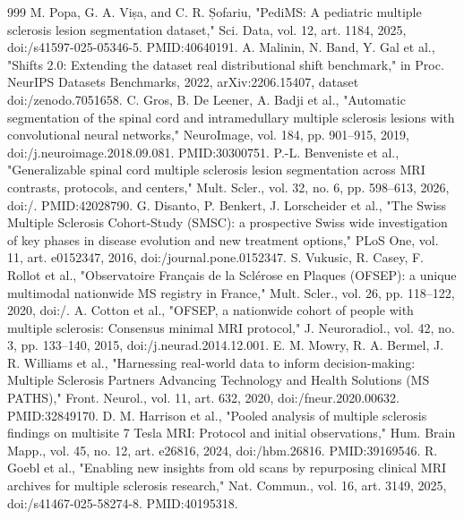 \documentclass[journal,twoside,web]{ieeecolor}
\begin{document}
\begin{thebibliography}{999}
 M. Popa, G. A. Vișa, and C. R. Șofariu, "PediMS: A pediatric multiple sclerosis lesion segmentation dataset," Sci. Data, vol. 12, art. 1184, 2025, doi:/\allowbreak s41597-025-05346-5. PMID:40640191.
 A. Malinin, N. Band, Y. Gal et al., "Shifts 2.0: Extending the dataset real distributional shift benchmark," in Proc. NeurIPS Datasets Benchmarks, 2022, arXiv:2206.15407, dataset doi:/\allowbreak zenodo.7051658.
 C. Gros, B. De Leener, A. Badji et al., "Automatic segmentation of the spinal cord and intramedullary multiple sclerosis lesions with convolutional neural networks," NeuroImage, vol. 184, pp. 901--915, 2019, doi:/\allowbreak j.neuroimage.2018.09.081. PMID:30300751.
 P.-L. Benveniste et al., "Generalizable spinal cord multiple sclerosis lesion segmentation across MRI contrasts, protocols, and centers," Mult. Scler., vol. 32, no. 6, pp. 598--613, 2026, doi:/. PMID:42028790.
 G. Disanto, P. Benkert, J. Lorscheider et al., "The Swiss Multiple Sclerosis Cohort-Study (SMSC): a prospective Swiss wide investigation of key phases in disease evolution and new treatment options," PLoS One, vol. 11, art. e0152347, 2016, doi:/\allowbreak journal.pone.0152347.
 S. Vukusic, R. Casey, F. Rollot et al., "Observatoire Français de la Sclérose en Plaques (OFSEP): a unique multimodal nationwide MS registry in France," Mult. Scler., vol. 26, pp. 118--122, 2020, doi:/.
 A. Cotton et al., "OFSEP, a nationwide cohort of people with multiple sclerosis: Consensus minimal MRI protocol," J. Neuroradiol., vol. 42, no. 3, pp. 133--140, 2015, doi:/\allowbreak j.neurad.2014.12.001.
 E. M. Mowry, R. A. Bermel, J. R. Williams et al., "Harnessing real-world data to inform decision-making: Multiple Sclerosis Partners Advancing Technology and Health Solutions (MS PATHS)," Front. Neurol., vol. 11, art. 632, 2020, doi:/\allowbreak fneur.2020.00632. PMID:32849170.
 D. M. Harrison et al., "Pooled analysis of multiple sclerosis findings on multisite 7 Tesla MRI: Protocol and initial observations," Hum. Brain Mapp., vol. 45, no. 12, art. e26816, 2024, doi:/\allowbreak hbm.26816. PMID:39169546.
 R. Goebl et al., "Enabling new insights from old scans by repurposing clinical MRI archives for multiple sclerosis research," Nat. Commun., vol. 16, art. 3149, 2025, doi:/\allowbreak s41467-025-58274-8. PMID:40195318.

\end{thebibliography}
\end{document}
